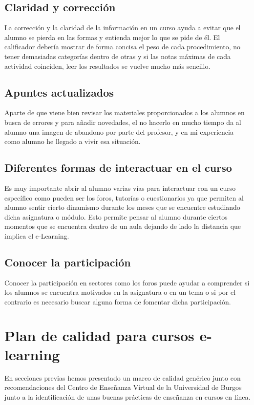 \subsection{Claridad y corrección}
La corrección y la claridad de la información en un curso ayuda a evitar que el alumno se pierda en las formas y entienda mejor lo que se pide de él.
El calificador debería mostrar de forma concisa el peso de cada procedimiento, no tener demasiadas categorías dentro de otras y si las notas máximas de cada actividad coinciden, leer los resultados se vuelve mucho más sencillo.

\subsection{Apuntes actualizados}
Aparte de que viene bien revisar los materiales proporcionados a los alumnos en busca de errores y para añadir novedades, el no hacerlo en mucho tiempo da al alumno una imagen de abandono por parte del profesor, y en mi experiencia como alumno he llegado a vivir esa situación.

\subsection{Diferentes formas de interactuar en el curso}
Es muy importante abrir al alumno varias vías para interactuar con un curso específico como pueden ser los foros, tutorías o cuestionarios ya que permiten al alumno sentir cierto dinamismo durante los meses que se encuentre estudiando dicha asignatura o módulo. Esto permite pensar al alumno durante ciertos momentos que se encuentra dentro de un aula dejando de lado la distancia que implica el e-Learning.

\subsection{Conocer la participación}
Conocer la participación en sectores como los foros puede ayudar a comprender si los alumnos se encuentra motivados en la asignatura o en un tema o si por el contrario es necesario buscar alguna forma de fomentar dicha participación.

\section{Plan de calidad para cursos e-learning}
En secciones previas hemos presentado un marco de calidad genérico junto con recomendaciones del Centro de Enseñanza Virtual de la Universidad de Burgos junto a la identificación de unas buenas prácticas de enseñanza en cursos en línea.

